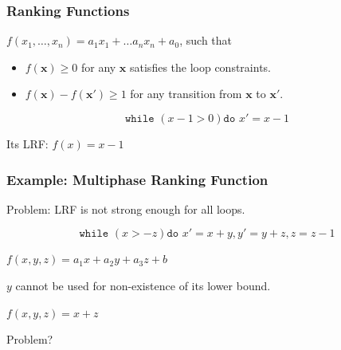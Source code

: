 \documentclass[11pt]{beamer}
\begin{document}
\begin{frame}\frametitle{Ranking Functions}

\begin{definition}

$f(x_1, \ldots, x_n) = a_1x_1 + \ldots a_nx_n + a_0$, such that

\begin{itemize}
\item $f(\textbf{x}) \ge 0$ for any $\textbf{x}$ satisfies the loop constraints.

\item $f(\textbf{x}) - f(\textbf{x}') \ge 1$ for any transition from $\textbf{x}$ to $\textbf{x}'$.



\end{itemize}
\end{definition}

\begin{example}
\[\texttt{while }( x - 1 > 0) \texttt{do } x' = x - 1\]

Its LRF: $f(x) = x - 1$
\end{example}

\end{frame}


\begin{frame}\frametitle{Example: Multiphase Ranking Function}
Problem: LRF is not strong enough for all loops.
\begin{example}
\[\texttt{while }( x > -z) \texttt{do } x' = x + y, y' = y + z, z = z - 1\]

$f(x, y, z) = a_1x + a_2y + a_3z + b$

$y$ cannot be used for non-existence of its lower bound.

$f(x, y, z) = x + z$

Problem?
\end{example}

\end{frame}
\end{document}
